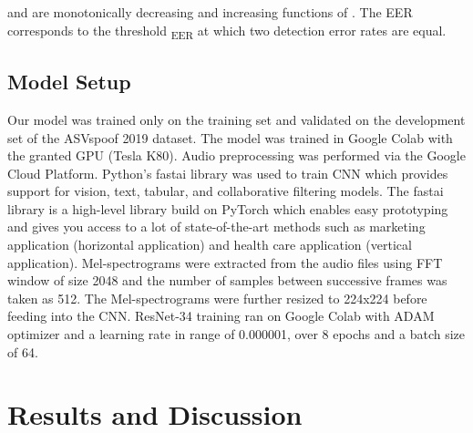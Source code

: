 \documentclass[a4paper]{article}
\begin{document}
    
     and  are monotonically decreasing and increasing functions of . The EER corresponds to the threshold \textsubscript{EER} at which two detection error rates are equal.

\subsection{Model Setup}
    Our model was trained only on the training set and validated on the development set of the ASVspoof 2019 dataset. The model was trained in Google Colab with the granted GPU (Tesla K80). Audio preprocessing was performed via the Google Cloud Platform. Python's fastai library was used to train CNN which provides support for vision, text, tabular, and collaborative filtering models. The fastai library is a high-level library build on PyTorch which enables easy prototyping and gives you access to a lot of state-of-the-art methods such as marketing application (horizontal application) and health care application (vertical application). Mel-spectrograms were extracted from the audio files using FFT window of size 2048 and the number of samples between successive frames was taken as 512. The Mel-spectrograms were further resized to 224x224 before feeding into the CNN.  ResNet-34 training ran on Google Colab with ADAM optimizer and a learning rate in range of 0.000001, over 8 epochs and a batch size of 64.


\section{Results and Discussion}

\begin{table}[th]
\caption{The experiment result obtained from ASVspoof 2019.}
\label{tab:result}
\centering
{}
\end{table}
\end{document}

